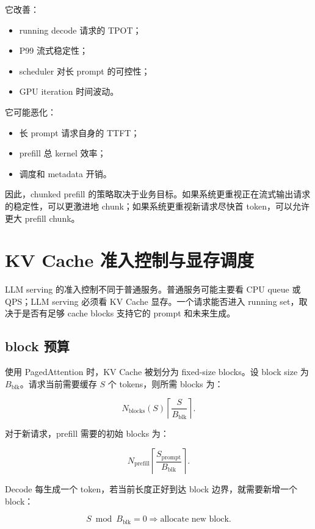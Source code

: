 它改善：

\begin{itemize}
\item running decode 请求的 TPOT；
\item P99 流式稳定性；
\item scheduler 对长 prompt 的可控性；
\item GPU iteration 时间波动。
\end{itemize}

它可能恶化：

\begin{itemize}
\item 长 prompt 请求自身的 TTFT；
\item prefill 总 kernel 效率；
\item 调度和 metadata 开销。
\end{itemize}

因此，chunked prefill 的策略取决于业务目标。如果系统更重视正在流式输出请求的稳定性，可以更激进地 chunk；如果系统更重视新请求尽快首 token，可以允许更大 prefill chunk。

\section{KV Cache 准入控制与显存调度}
\label{sec:kv-cache-admission-control}

LLM serving 的准入控制不同于普通服务。普通服务可能主要看 CPU queue 或 QPS；LLM serving 必须看 KV Cache 显存。一个请求能否进入 running set，取决于是否有足够 cache blocks 支持它的 prompt 和未来生成。

\subsection{block 预算}
\label{subsec:block-budget}

使用 PagedAttention 时，KV Cache 被划分为 fixed-size blocks。设 block size 为 $B_{\mathrm{blk}}$。请求当前需要缓存 $S$ 个 tokens，则所需 blocks 为：

\[
N_{\mathrm{blocks}}(S)
\left\lceil
\frac{S}{B_{\mathrm{blk}}}
\right\rceil.
\]

对于新请求，prefill 需要的初始 blocks 为：

\[
N_{\mathrm{prefill}}
\left\lceil
\frac{S_{\mathrm{prompt}}}{B_{\mathrm{blk}}}
\right\rceil.
\]

Decode 每生成一个 token，若当前长度正好到达 block 边界，就需要新增一个 block：

\[
S\bmod B_{\mathrm{blk}}=0
\Rightarrow
\text{allocate new block}.
\]

